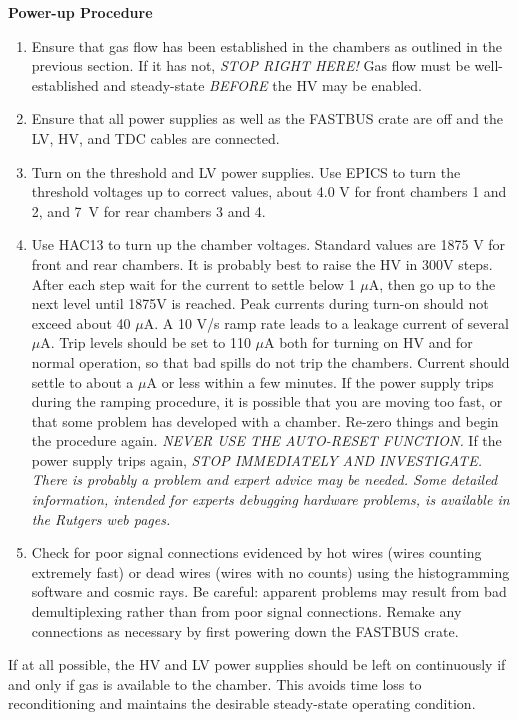 {\begin{center}
{\bf Power-up Procedure}
\end{center}

\begin{enumerate}
\item {Ensure that gas flow has been established in the chambers as
outlined in the previous section.  If it has not, {\it STOP RIGHT
HERE!}  Gas flow must be well-established and steady-state
{\it BEFORE} the HV may be enabled.}
\item {Ensure that all power supplies as well as the FASTBUS crate
are off and the LV, HV, and TDC cables are connected.}
\item {Turn on the threshold and LV power supplies. Use EPICS to turn the
threshold voltages up to correct values, about 4.0 V for front chambers 
1 and 2, and 7~V for rear chambers 3 and 4.}
\item {Use HAC13 to turn up the chamber voltages. Standard
values are 1875 V for front and rear chambers.
It is probably best to raise the HV in 300V steps. After each
step wait for the current to settle below 1 $\mu$A, then
go up to the next level until 1875V is reached.
Peak currents during  turn-on should not exceed about 40 $\mu$A. 
A 10 V/s ramp rate leads to a leakage current of several $\mu$A.
Trip levels should be set to 110 $\mu$A both for turning on HV and
for normal operation, so that bad spills do not trip the chambers.
Current should settle to about a $\mu$A or less within a few minutes.
If the power supply trips during the ramping procedure, it
is possible that you are moving too fast, or that some
problem has developed with a chamber.
Re-zero things and begin the procedure again.
{\it NEVER USE THE AUTO-RESET FUNCTION.}}  If
the power supply trips again, {\it STOP IMMEDIATELY AND INVESTIGATE.
There is probably a problem and expert advice may be needed.
Some detailed information, intended for experts debugging hardware
problems, is available in the Rutgers web pages. }
\item {Check for poor signal connections evidenced by hot wires (wires
counting extremely fast) or dead wires (wires with no counts) using
the histogramming software and cosmic rays.
Be careful: apparent problems may result from bad demultiplexing rather than
from poor signal connections.
Remake any connections as necessary by first powering down the FASTBUS crate.}
\end{enumerate}

If at all possible, the HV and LV power supplies should be left
on continuously if and only if gas is available to the chamber.  This
avoids time loss to reconditioning and maintains the desirable
steady-state operating condition.


}
